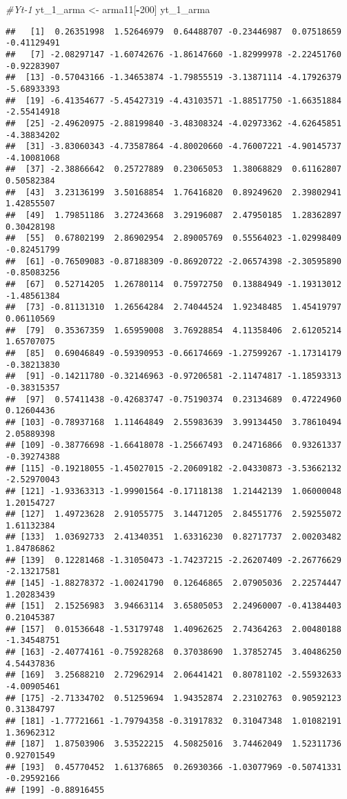 \documentclass[
]{article}
\newenvironment{Shaded}{\begin{snugshade}}{\end{snugshade}}
\newcommand{\CommentTok}[1]{\textcolor[rgb]{0.56,0.35,0.01}{\textit{#1}}}
\newcommand{\DecValTok}[1]{\textcolor[rgb]{0.00,0.00,0.81}{#1}}
\newcommand{\NormalTok}[1]{#1}
\newcommand{\OtherTok}[1]{\textcolor[rgb]{0.56,0.35,0.01}{#1}}
\newcommand{\SpecialCharTok}[1]{\textcolor[rgb]{0.81,0.36,0.00}{\textbf{#1}}}
\begin{document}
\begin{Shaded}
\begin{Highlighting}[]
\CommentTok{\#Yt{-}1}
\NormalTok{yt\_1\_arma }\OtherTok{\textless{}{-}}\NormalTok{ arma11[}\SpecialCharTok{{-}}\DecValTok{200}\NormalTok{]}
\NormalTok{yt\_1\_arma}
\end{Highlighting}
\end{Shaded}

\begin{verbatim}
##   [1]  0.26351998  1.52646979  0.64488707 -0.23446987  0.07518659 -0.41129491
##   [7] -2.08297147 -1.60742676 -1.86147660 -1.82999978 -2.22451760 -0.92283907
##  [13] -0.57043166 -1.34653874 -1.79855519 -3.13871114 -4.17926379 -5.68933393
##  [19] -6.41354677 -5.45427319 -4.43103571 -1.88517750 -1.66351884 -2.55414918
##  [25] -2.49620975 -2.88199840 -3.48308324 -4.02973362 -4.62645851 -4.38834202
##  [31] -3.83060343 -4.73587864 -4.80020660 -4.76007221 -4.90145737 -4.10081068
##  [37] -2.38866642  0.25727889  0.23065053  1.38068829  0.61162807  0.50582384
##  [43]  3.23136199  3.50168854  1.76416820  0.89249620  2.39802941  1.42855507
##  [49]  1.79851186  3.27243668  3.29196087  2.47950185  1.28362897  0.30428198
##  [55]  0.67802199  2.86902954  2.89005769  0.55564023 -1.02998409 -0.82451799
##  [61] -0.76509083 -0.87188309 -0.86920722 -2.06574398 -2.30595890 -0.85083256
##  [67]  0.52714205  1.26780114  0.75972750  0.13884949 -1.19313012 -1.48561384
##  [73] -0.81131310  1.26564284  2.74044524  1.92348485  1.45419797  0.06110569
##  [79]  0.35367359  1.65959008  3.76928854  4.11358406  2.61205214  1.65707075
##  [85]  0.69046849 -0.59390953 -0.66174669 -1.27599267 -1.17314179 -0.38213830
##  [91] -0.14211780 -0.32146963 -0.97206581 -2.11474817 -1.18593313 -0.38315357
##  [97]  0.57411438 -0.42683747 -0.75190374  0.23134689  0.47224960  0.12604436
## [103] -0.78937168  1.11464849  2.55983639  3.99134450  3.78610494  2.05889398
## [109] -0.38776698 -1.66418078 -1.25667493  0.24716866  0.93261337 -0.39274388
## [115] -0.19218055 -1.45027015 -2.20609182 -2.04330873 -3.53662132 -2.52970043
## [121] -1.93363313 -1.99901564 -0.17118138  1.21442139  1.06000048  1.20154727
## [127]  1.49723628  2.91055775  3.14471205  2.84551776  2.59255072  1.61132384
## [133]  1.03692733  2.41340351  1.63316230  0.82717737  2.00203482  1.84786862
## [139]  0.12281468 -1.31050473 -1.74237215 -2.26207409 -2.26776629 -2.13217581
## [145] -1.88278372 -1.00241790  0.12646865  2.07905036  2.22574447  1.20283439
## [151]  2.15256983  3.94663114  3.65805053  2.24960007 -0.41384403  0.21045387
## [157]  0.01536648 -1.53179748  1.40962625  2.74364263  2.00480188 -1.34548751
## [163] -2.40774161 -0.75928268  0.37038690  1.37852745  3.40486250  4.54437836
## [169]  3.25688210  2.72962914  2.06441421  0.80781102 -2.55932633 -4.00905461
## [175] -2.71334702  0.51259694  1.94352874  2.23102763  0.90592123  0.31384797
## [181] -1.77721661 -1.79794358 -0.31917832  0.31047348  1.01082191  1.36962312
## [187]  1.87503906  3.53522215  4.50825016  3.74462049  1.52311736  0.92701549
## [193]  0.45770452  1.61376865  0.26930366 -1.03077969 -0.50741331 -0.29592166
## [199] -0.88916455
\end{verbatim}
\end{document}
